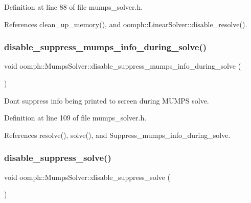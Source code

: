Definition at line 88 of file mumps\+\_\+solver.\+h.



References clean\+\_\+up\+\_\+memory(), and oomph\+::\+Linear\+Solver\+::disable\+\_\+resolve().

\mbox{\label{classoomph_1_1MumpsSolver_ad75c9ff36be18867a88e0a68fac68f7c}} 
\subsubsection{\texorpdfstring{disable\+\_\+suppress\+\_\+mumps\+\_\+info\+\_\+during\+\_\+solve()}{disable\_suppress\_mumps\_info\_during\_solve()}}
{\footnotesize\ttfamily void oomph\+::\+Mumps\+Solver\+::disable\+\_\+suppress\+\_\+mumps\+\_\+info\+\_\+during\+\_\+solve (\begin{DoxyParamCaption}{ }\end{DoxyParamCaption})\hspace{0.3cm}{\ttfamily [inline]}}



Don\textquotesingle{}t suppress info being printed to screen during M\+U\+M\+PS solve. 



Definition at line 109 of file mumps\+\_\+solver.\+h.



References resolve(), solve(), and Suppress\+\_\+mumps\+\_\+info\+\_\+during\+\_\+solve.

\mbox{\label{classoomph_1_1MumpsSolver_a34346022a010acc09dc0ab1ce59d90a7}} 
\subsubsection{\texorpdfstring{disable\+\_\+suppress\+\_\+solve()}{disable\_suppress\_solve()}}
{\footnotesize\ttfamily void oomph\+::\+Mumps\+Solver\+::disable\+\_\+suppress\+\_\+solve (\begin{DoxyParamCaption}{ }\end{DoxyParamCaption})\hspace{0.3cm}{\ttfamily [inline]}}




